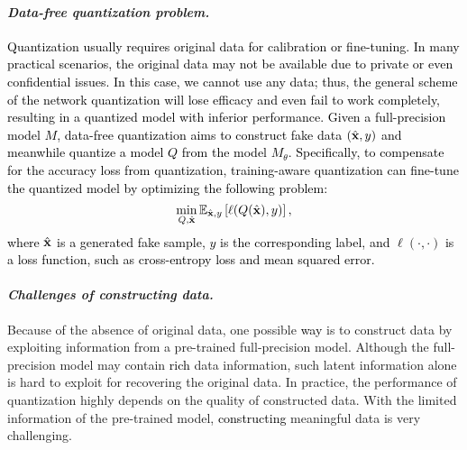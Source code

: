\documentclass[runningheads]{llncs}
\def\bx{{\bf x}}
\def\mmE{{\mathbb E}}
\def\bx{{\bf x}}
\def\jie{\textcolor{black}}
\def\new{\textcolor{black}}
\begin{document}
\paragraph{\textbf{\emph{Data-free quantization problem.}}}
\jie{
Quantization usually requires original data for calibration or fine-tuning.
In many practical scenarios, the original data may not be available due to private or even confidential issues.
In this case, we cannot use any data\new{; thus,} the general scheme of the network quantization will lose efficacy and even fail to work completely, resulting in a quantized model with inferior performance.
Given a full-precision model $M$, data-free quantization aims to construct fake data $(\hat{\bx}, y)$ and meanwhile quantize a model $Q$ from the model $M_{\theta}$. 
Specifically, to compensate for the accuracy loss from quantization, training-aware quantization can fine-tune the quantized model by optimizing the following problem:
\begin{equation}
    \min_{Q, \hat{\bx}} \mmE_{\hat{\bx}, y}
    \left[\ell({Q}(\hat{\bx}), y)\right],
\end{equation}
where $\hat{\bx}$ is a generated fake sample, $y$ is the corresponding label\new{, and} $\ell(\cdot,\cdot)$ is a loss function, such as cross-entropy loss and mean squared error.
}



\paragraph{\textbf{\emph{Challenges of constructing data.}}}
Because of the absence of original data, one possible \new{way} is to construct data by exploiting information from a pre-trained full-precision model. 
Although the full-precision model may contain \new{rich} data information, such latent information alone is hard to exploit for recovering the original data.
In practice, the performance of quantization highly depends on the quality of constructed data.
With the limited information of the pre-trained model, \new{constructing} meaningful data is very challenging.
\end{document}

